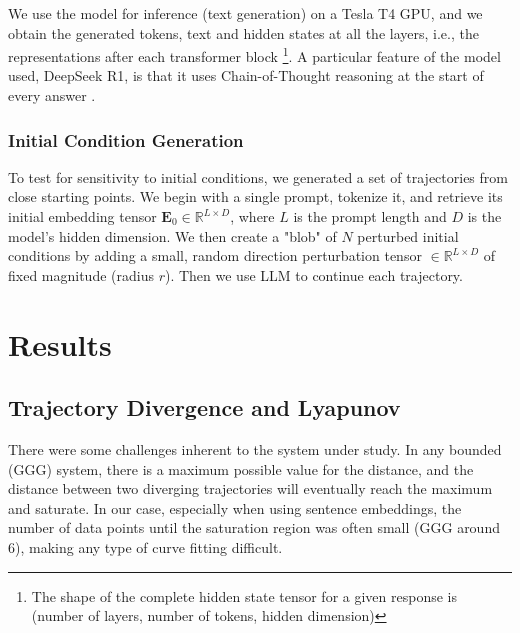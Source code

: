 \documentclass[a4paper,12pt]{article}
\begin{document}
We use the model for inference (text generation) on a Tesla T4 GPU, and we obtain the generated tokens, text and hidden states at all the layers, i.e., the representations after each transformer block \footnote{The shape of the complete hidden state tensor for a given response is (number of layers, number of tokens, hidden dimension)}. A particular feature of the model used, DeepSeek R1, is that it uses Chain-of-Thought reasoning at the start of every answer \cite{deepseekR1}.

\subsubsection{Initial Condition Generation}
\label{subsec:init_cond_gen}
To test for sensitivity to initial conditions, we generated a set of trajectories from close starting points. We begin with a single prompt, tokenize it, and retrieve its initial embedding tensor $\mathbf{E}_0 \in \mathbb{R}^{L \times D}$, where $L$ is the prompt length and $D$ is the model's hidden dimension. We then create a "blob" of $N$ perturbed initial conditions by adding a small, random direction perturbation tensor $\in \mathbb{R}^{L \times D}$ of fixed magnitude (radius $r$). Then we use LLM to continue each trajectory.

\section{Results}
\label{sec:results}

\subsection{Trajectory Divergence and Lyapunov} \label{res:lyapunov} %

There were some challenges inherent to the system under study. In any bounded (GGG) system, there is a maximum possible value for the distance, and the distance between two diverging trajectories will eventually reach the maximum and saturate. In our case, especially when using sentence embeddings, the number of data points until the saturation region was often small (GGG around 6), making any type of curve fitting difficult.
\end{document}
